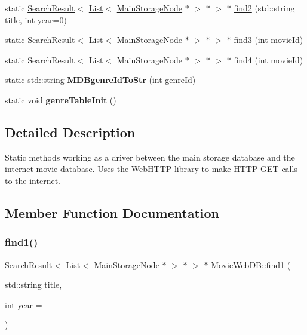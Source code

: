 \begin{DoxyCompactItemize}
static \hyperlink{class_search_result}{Search\+Result}$<$ \hyperlink{class_list}{List}$<$ \hyperlink{class_main_storage_node}{Main\+Storage\+Node} $\ast$ $>$ $\ast$ $>$ $\ast$ \hyperlink{class_movie_web_d_b_a2beb662521e52fcfaef0261f06c5aeaa}{find2} (std\+::string title, int year=0)
\item 
static \hyperlink{class_search_result}{Search\+Result}$<$ \hyperlink{class_list}{List}$<$ \hyperlink{class_main_storage_node}{Main\+Storage\+Node} $\ast$ $>$ $\ast$ $>$ $\ast$ \hyperlink{class_movie_web_d_b_a42c482229bd6f954d66febbeef00809b}{find3} (int movie\+Id)
\item 
static \hyperlink{class_search_result}{Search\+Result}$<$ \hyperlink{class_list}{List}$<$ \hyperlink{class_main_storage_node}{Main\+Storage\+Node} $\ast$ $>$ $\ast$ $>$ $\ast$ \hyperlink{class_movie_web_d_b_a3c6ba36eea86b1d5138f639662927981}{find4} (int movie\+Id)
\item 
\mbox{\label{class_movie_web_d_b_ad1cd751d1fd9b6f453296941e405f507}} 
static std\+::string {\bfseries M\+D\+Bgenre\+Id\+To\+Str} (int genre\+Id)
\item 
\mbox{\label{class_movie_web_d_b_aae359f30a0efdb2fc49ea771ab2ca998}} 
static void {\bfseries genre\+Table\+Init} ()
\end{DoxyCompactItemize}


\subsection{Detailed Description}
Static methods working as a driver between the main storage database and the internet movie database. Uses the Web\+H\+T\+TP library to make H\+T\+TP G\+ET calls to the internet. 

\subsection{Member Function Documentation}
\mbox{\label{class_movie_web_d_b_a13c5f57385ee26b1f3750a09287c8f77}} 
\subsubsection{\texorpdfstring{find1()}{find1()}}
{\footnotesize\ttfamily \hyperlink{class_search_result}{Search\+Result}$<$ \hyperlink{class_list}{List}$<$ \hyperlink{class_main_storage_node}{Main\+Storage\+Node} $\ast$ $>$ $\ast$ $>$ $\ast$ Movie\+Web\+D\+B\+::find1 (\begin{DoxyParamCaption}\item[{std\+::string}]{title,  }\item[{int}]{year = {} }\end{DoxyParamCaption})\hspace{0.3cm}{\ttfamily [static]}}

